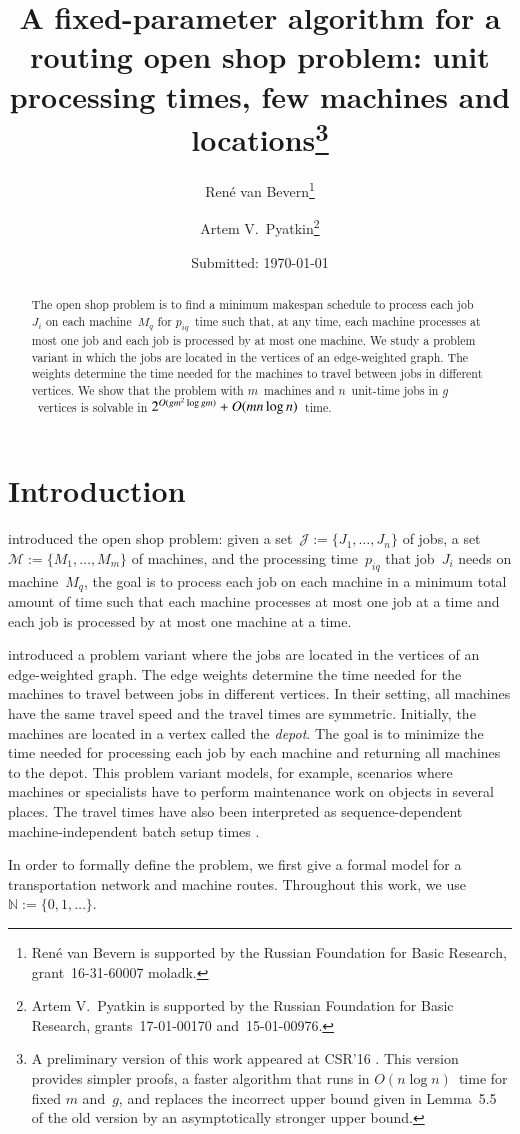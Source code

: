 \documentclass[natbib,sort,smallextended,envcountsame,envcountsect,numbook]{svjour3}
\title{A fixed-parameter algorithm for a routing open shop problem: unit processing times, few machines and locations\thanks{A preliminary version of this work appeared at CSR'16 \citep{BP16}.  This version provides simpler proofs, a faster algorithm that runs in \(O(n\log n)\)~time for fixed \(m\) and~\(g\), and replaces the incorrect upper bound given in Lemma~5.5 of the old version by an asymptotically stronger upper bound.}}
\author{René van Bevern\thanks{René van Bevern is supported
by the Russian Foundation for Basic Research, grant~16-31-60007 mol\textunderscore{}a\textunderscore{}dk.}
\and
Artem V.\ Pyatkin\thanks{Artem V.\ Pyatkin is supported
by the Russian Foundation for Basic Research, grants~17-01-00170 and~15-01-00976.}}
\institute{René van Bevern \and Artem V.\ Pyatkin \at Novosibirsk
  State University, Novosibirsk, Russian Federation,
  \email{rvb@nsu.ru, artem@math.nsc.ru} \and René van Bevern \and
  Artem V.\ Pyatkin \at Sobolev Institute of Mathematics of the
  Siberian Branch of the Russian Academy of Sciences, Novosibirsk,
  Russian Federation}
\date{Submitted: \today{}}
\newcommand{\bigO}{O}
\newcommand{\Js}{\mathcal J}
\newcommand{\Ms}{\mathcal M}
\newcommand{\nmach}{m}
\newcommand{\nverts}{g}
\begin{document}
\maketitle
\begin{abstract}
  \noindent{}
  The open shop problem is
  to find a minimum makespan schedule
  to process each job~\(J_i\)
  on each machine~\(M_q\)
  for $p_{iq}$~time
  such that,
  at any time,
  each machine processes at most one job
  and
  each job is processed by at most one machine.
  We study a problem variant in which the jobs are located
  in the vertices
  of an edge-weighted graph.
  The weights determine the time needed
  for the machines
  to travel between jobs in different vertices.
  We show that the problem with \(m\)~machines and
  \(n\)~unit-time jobs in \(g\)~vertices
  is solvable in \(2^{\smash{\bigO(\nverts\nmach^2\log\nverts\nmach)}}+O(mn\log n)\)~time.
\end{abstract}
\section{Introduction} 
\noindent
\citet{GS76} introduced the open shop problem:
given
a set~$\Js:=\{J_1,\dots,J_n\}$ of jobs,
a set~$\Ms:=\{M_1,\dots,M_m\}$ of machines,
and the processing time~$p_{iq}$ that job~$J_i$ needs on machine~$M_q$,
the goal is
to process each job on each machine
in a minimum total amount of time
such that
each machine processes at most one job at a time
and
each job is processed by at most one machine at a time.

\citet{ABC06} introduced a problem variant
where the jobs are located
in the vertices of an edge-weighted graph.
The edge weights determine
the time needed for the machines to travel between jobs in different vertices.
In their setting, all machines have the same travel speed
and
the travel times are symmetric.
Initially,
the machines are located in a vertex called the \emph{depot}.
The goal is to minimize
the time needed for processing
each job by each machine and
returning all machines to the depot.
This problem variant models, for example, scenarios
where machines or specialists
have to perform maintenance work
on objects in several places.
The travel times have also been interpreted
as sequence-dependent machine-independent
batch setup times \citep{ANCK08,ZW06}.

In order to formally define the problem,
we first give a formal model for a transportation network
and machine routes.
Throughout this work,
we use~\(\mathbb N:=\{0,1,\dots\}\).
\end{document}
